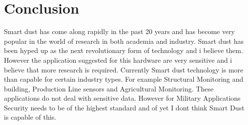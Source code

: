 \documentclass[article]{IEEEtran}
\begin{document}
\section{Conclusion}
Smart dust has come along rapidly in the past 20 years and has become very popular in the world of research in both academia and industry. Smart dust has been hyped up as the next revolutionary form of technology and i believe them. However the application suggested for this hardware are very sensitive and i believe that more research is required. Currently Smart dust technology is more than capable for certain industry types. For example Structural Monitoring and building, Production Line sensors and Agricultural Monitoring. These applications do not deal with sensitive data. However for Military Applications Security needs to be of the highest standard and of yet I dont think Smart Dust is capable of this. 
\listoffigures
\printbibliography
\end{document}
